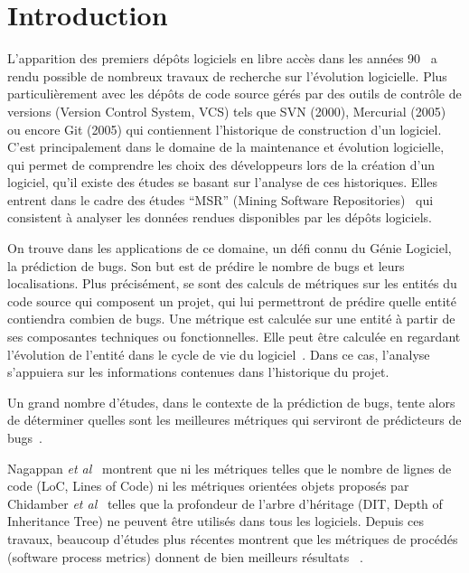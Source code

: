 \section{Introduction}
\label{sec:intro}

L'apparition des premiers dépôts logiciels en libre accès dans les années 90~\cite{list_vcs} a rendu possible de nombreux travaux de recherche sur l'évolution logicielle. Plus particulièrement avec les dépôts de code source gérés par des outils de contrôle de versions (Version Control System, VCS) tels que  SVN (2000), Mercurial (2005) ou encore Git (2005) qui contiennent l'historique de construction d'un logiciel.\\  

C'est principalement dans le domaine de la maintenance et évolution logicielle, qui permet de comprendre les choix des développeurs lors de la création d'un logiciel, qu'il existe des études se basant sur l'analyse de ces historiques. Elles entrent dans le cadre des études ``MSR'' (Mining Software Repositories)~\cite{herzig-makingsoftware-2010} qui consistent à analyser les données rendues disponibles par les dépôts logiciels.

On trouve dans les applications de ce domaine, un défi connu du Génie Logiciel, la prédiction de bugs. Son but est de prédire le nombre de bugs et leurs localisations. Plus précisément, se sont des calculs de métriques sur les entités du code source qui composent un projet, qui lui permettront de prédire quelle entité contiendra combien de bugs. Une métrique est calculée sur une entité à partir de ses composantes techniques ou fonctionnelles. Elle peut être calculée en regardant l'évolution de l'entité dans le cycle de vie du logiciel~\cite{dambros_relationship_2009,caglayan_merits_2009}. Dans ce cas, l'analyse s'appuiera sur les informations contenues dans l'historique du projet.

Un grand nombre d'études, dans le contexte de la prédiction de bugs, tente alors de déterminer quelles sont les meilleures métriques qui serviront de prédicteurs de bugs~\cite{fenton_critique_1999}.

Nagappan \emph{et al}~\cite{nagappan_mining_2006} montrent que ni les métriques telles que le nombre de lignes de code (LoC, Lines of Code) ni les métriques orientées objets proposés par Chidamber \emph{et al}~\cite{chidamber_metrics_1994} telles que la profondeur de l'arbre d'héritage (DIT, Depth of Inheritance Tree) ne peuvent être utilisés dans tous les logiciels. Depuis ces travaux, beaucoup d'études plus récentes montrent que les métriques de procédés (software process metrics) donnent de bien meilleurs résultats ~\cite{nagappan_use_2005,weyuker_too_2008,bird_dont_2011,giger_can_2012}.\\

